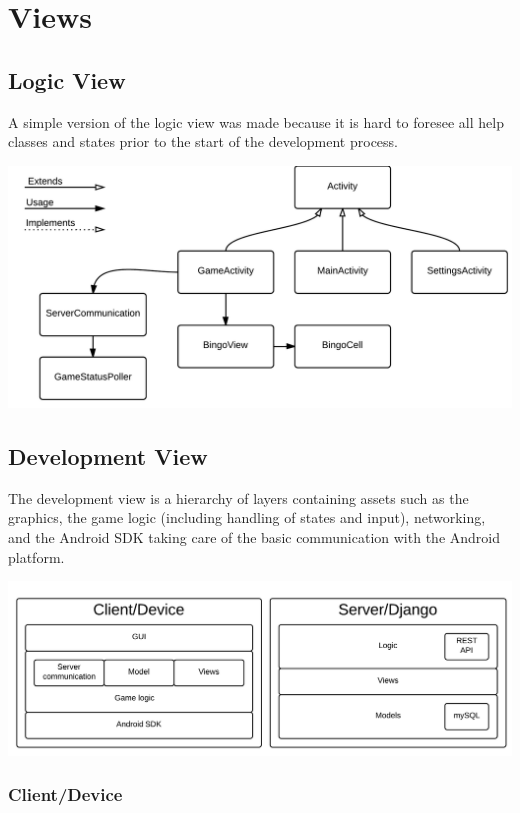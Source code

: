 \section{Views}
\label{sec:views}

\subsection{Logic View}
A simple version of the logic view was made because it is hard to foresee all
help classes and states prior to the start of the development process.
\begin{center}
\includegraphics[clip=true, width=0.9 \textwidth]{Pikks/LogicViewFinal.png}
\label{ref:gantt}
\end{center}

\subsection{Development View}
The development view is a hierarchy of layers containing assets such as the
graphics, the game logic (including handling of states and input), networking,
and the Android SDK taking care of the basic communication with the Android platform.
\begin{center}
\includegraphics[clip=true, width=0.9 \textwidth]{Pikks/DevelopmentViewFinal.png}
\label{ref:gantt}
\end{center}

\subsubsection{Client/Device}

